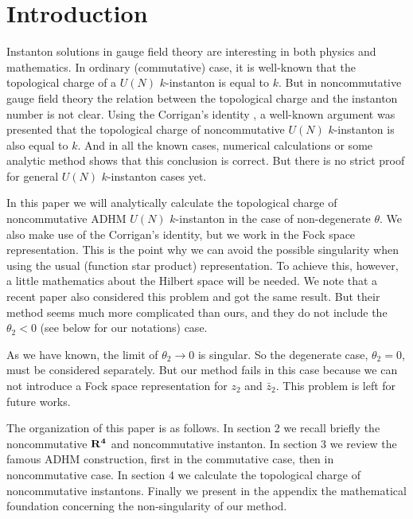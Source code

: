 \documentclass[a4paper,a4paper]{article}
\begin{document}
\newpage

\section{Introduction}

Instanton solutions in gauge field theory are interesting in both physics and mathematics. In ordinary (commutative) case, it is well-known that the topological charge of a $U(N)$ $%
k$-instanton is equal to $k$. But in noncommutative gauge field
theory the relation between the topological charge and the
instanton number is not clear. Using the Corrigan's identity
\cite{Corrigan}, a well-known argument was presented \cite{Paperd}
that the topological charge of noncommutative $U(N)$ $k$-instanton
is also equal to $k$. And in all the known cases, numerical calculations \cite%
{Paperd}\cite{TianZhu} or some analytic method \cite{Calculus} shows that
this conclusion is correct. But there is no strict proof for general $U(N)$ $%
k$-instanton cases yet.

In this paper we will analytically calculate the topological
charge of noncommutative ADHM $U(N)$ $k$-instanton in the case of
non-degenerate $\theta$. We also make use of the Corrigan's
identity, but we work in the Fock space representation. This is
the point why we can avoid the possible singularity when using the
usual (function star product) representation. To achieve this,
however, a little mathematics about the Hilbert space will be
needed. We note that a recent paper \cite{charge} also considered
this problem and got the same result. But their method seems much
more complicated than ours, and they do not include the
$\theta_2<0$ (see below for our notations) case.

As we have known, the limit of $\theta_2\rightarrow 0$ is
singular. So the degenerate case, $\theta_2=0$, must be considered
separately. But our method fails in this case because we can not
introduce a Fock space representation for $z_2$ and $\bar{z}_2$.
This problem is left for future works.

The organization of this paper is as follows. In section 2 we
recall briefly the noncommutative $\bf{R}^4$ and noncommutative
instanton. In section 3 we review the famous ADHM construction,
first in the commutative case, then in noncommutative case. In
section 4 we calculate the topological charge of noncommutative
instantons. Finally we present in the appendix the mathematical
foundation concerning the non-singularity of our method.
\end{document}

